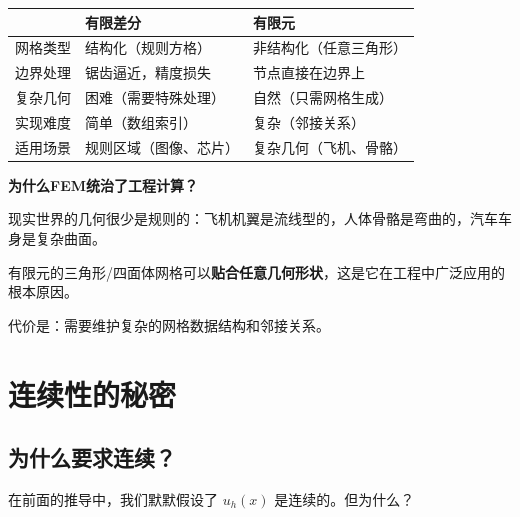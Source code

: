 \begin{center}
\renewcommand{\arraystretch}{1.4}
\begin{tabular}{l|p{5cm}|p{5cm}}
\toprule
& \textbf{有限差分} & \textbf{有限元} \\
\midrule
网格类型 & 结构化（规则方格） & 非结构化（任意三角形） \\
边界处理 & 锯齿逼近，精度损失 & 节点直接在边界上 \\
复杂几何 & 困难（需要特殊处理） & 自然（只需网格生成） \\
实现难度 & 简单（数组索引） & 复杂（邻接关系） \\
适用场景 & 规则区域（图像、芯片） & 复杂几何（飞机、骨骼） \\
\bottomrule
\end{tabular}
\end{center}

\begin{physicalmeaning}
\textbf{为什么FEM统治了工程计算？}

现实世界的几何很少是规则的：飞机机翼是流线型的，人体骨骼是弯曲的，汽车车身是复杂曲面。

有限元的三角形/四面体网格可以\textbf{贴合任意几何形状}，这是它在工程中广泛应用的根本原因。

代价是：需要维护复杂的网格数据结构和邻接关系。
\end{physicalmeaning}

\section{连续性的秘密}

\subsection{为什么要求连续？}

在前面的推导中，我们默默假设了 $u_h(x)$ 是连续的。但为什么？

